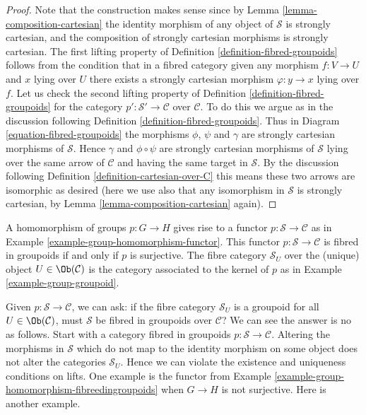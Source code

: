 \begin{proof}
Note that the construction makes sense since by
Lemma \ref{lemma-composition-cartesian}
the identity morphism of any object of $\mathcal{S}$ is strongly cartesian,
and the composition of strongly cartesian morphisms is strongly cartesian.
The first lifting property of
Definition \ref{definition-fibred-groupoids}
follows from the condition that in a fibred category
given any morphism $f : V \to U$ and $x$ lying over $U$ there exists
a strongly cartesian morphism $\varphi : y \to x$ lying over $f$.
Let us check the second lifting property of
Definition \ref{definition-fibred-groupoids}
for the category $p' : \mathcal{S}' \to \mathcal{C}$ over $\mathcal{C}$.
To do this we argue as in the discussion following
Definition \ref{definition-fibred-groupoids}.
Thus in Diagram \ref{equation-fibred-groupoids} the
morphisms $\phi$, $\psi$ and $\gamma$ are strongly cartesian morphisms
of $\mathcal{S}$.
Hence $\gamma$ and $\phi \circ \psi$ are strongly cartesian morphisms
of $\mathcal{S}$ lying over the same arrow of $\mathcal{C}$ and
having the same target in $\mathcal{S}$. By the discussion following
Definition \ref{definition-cartesian-over-C}
this means these two arrows are isomorphic as desired (here we use also
that any isomorphism in $\mathcal{S}$ is strongly cartesian, by
Lemma \ref{lemma-composition-cartesian} again).
\end{proof}

\begin{example}
\label{example-group-homomorphism-fibreedingroupoids}
A homomorphism of groups $p : G \to H$ gives rise to a functor
$p : \mathcal{S}\to\mathcal{C}$ as in Example
\ref{example-group-homomorphism-functor}. This functor
$p : \mathcal{S}\to\mathcal{C}$ is fibred in groupoids if and only if
$p$ is surjective. The fibre category $\mathcal{S}_U$ over the (unique)
object $U\in \Ob(\mathcal{C})$ is the category associated to the
kernel of $p$ as in Example \ref{example-group-groupoid}.
\end{example}

\noindent
Given $p : \mathcal{S} \to \mathcal{C}$, we can ask: if the fibre
category $\mathcal{S}_U$ is a groupoid for all $U \in \Ob(\mathcal{C})$,
must $\mathcal{S}$ be fibred in groupoids over $\mathcal{C}$? We can see the
answer is no as follows. Start with a category fibred in groupoids
$p : \mathcal{S} \to \mathcal{C}$. Altering the morphisms in $\mathcal{S}$
which do not map to the identity morphism on some object does not alter the
categories $\mathcal{S}_U$. Hence we can violate the existence and uniqueness
conditions on lifts. One example is the functor from Example
\ref{example-group-homomorphism-fibreedingroupoids} when $G \to H$ is not
surjective. Here is another example.

